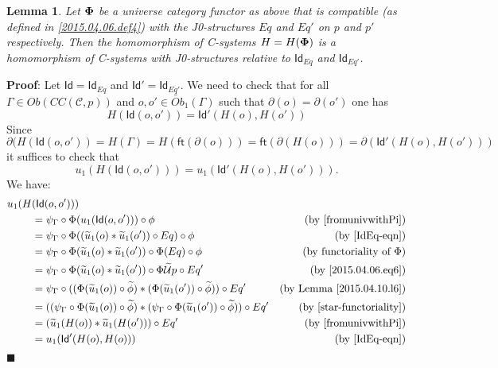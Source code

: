 \documentclass[12pt]{article}
\numberwithin{equation}{section}
\newenvironment{myproof}{{\bf Proof}:}{$\blacksquare$ \vskip 5mm }
\newtheorem{lemma}[proposition]{Lemma}
\newcommand{\by}[1]{\text{(by #1)}}
\newcommand{\wt}{\widetilde}
\newcommand{\toCC}{CC} %
\newcommand{\C}{{\mathcal C}}  %
\newcommand{\ft}{\mathsf{ft}}
\newcommand{\Id}{\mathsf{Id}} %
\newcommand{\U}{\mathcal{U}}
\newcommand{\Obwt}{\wt{Ob}}
\begin{document}
\begin{lemma}
\label{2015.04.12.l1} Let ${\bf\Phi}$ be a universe category functor as above
that is compatible (as defined in \ref{2015.04.06.def4}) with the J0-structures $Eq$ and $Eq'$ on $p$ and $p'$
respectively. Then the homomorphism of C-systems $H=H({\bf\Phi})$ is a
homomorphism of C-systems with J0-structures relative to $\Id_{Eq}$ and
$\Id_{Eq'}$.
\end{lemma}
%
\begin{myproof}
Let $\Id=\Id_{Eq}$ and $\Id'=\Id_{Eq'}$. We need to check that for all
$\Gamma\in Ob(\toCC({\C},p))$ and $o,o'\in \Obwt_1(\Gamma)$ such that
$\partial(o)=\partial(o')$ one has
%
$$H(\Id(o,o'))=\Id'(H(o),H(o'))$$
%
Since
%
$$\partial(H(\Id(o,o'))=H(\Gamma)=H(\ft(\partial(o)))=\ft(\partial(H(o)))=\partial(\Id'(H(o),H(o')))$$
%
it suffices to check that
%
$$u_1(H(\Id(o,o')))=u_1(\Id'(H(o),H(o'))).$$
%
We have:
%
\begin{align*}
  u_1(H&(\Id(o,o'))) \\
  & = \psi_{\Gamma}\circ\Phi(u_1(\Id(o,o')))\circ\phi & \by{\cite[Lemma 6.1(1)]{fromunivwithPi}} \\
  & = \psi_{\Gamma}\circ\Phi((\wt{u}_1(o)*\wt{u}_1(o'))\circ Eq)\circ\phi & \by{\ref{IdEq-eqn}} \\
  & = \psi_{\Gamma}\circ\Phi(\wt{u}_1(o)*\wt{u}_1(o'))\circ \Phi(Eq)\circ\phi & \by{functoriality of $\Phi$} \\
  & = \psi_{\Gamma}\circ\Phi(\wt{u}_1(o)*\wt{u}_1(o'))\circ \Phi\wt{\U}p\circ Eq' & \by{\ref{2015.04.06.eq6}} \\
  & = \psi_{\Gamma}\circ((\Phi(\wt{u}_1(o))\circ\wt{\phi})*(\Phi(\wt{u}_1(o'))\circ\wt{\phi}))\circ Eq' & \by{Lemma \ref{2015.04.10.l6}} \\
  & = ((\psi_{\Gamma}\circ\Phi(\wt{u}_1(o))\circ\wt{\phi})*(\psi_{\Gamma}\circ\Phi(\wt{u}_1(o'))\circ\wt{\phi}))\circ Eq' & \by{\ref{star-functoriality}} \\
  & = (\wt{u}_1(H(o))*\wt{u}_1(H(o')))\circ Eq' & \by{\cite[Lemma 6.1(2)]{fromunivwithPi}} \\
  & = u_1(\Id'(H(o),H(o))) & \by{\ref{IdEq-eqn}}
\end{align*}
\end{myproof}
\end{document}
